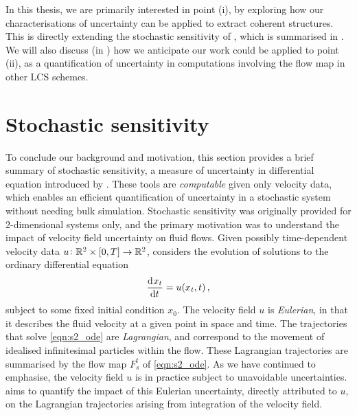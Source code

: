 In this thesis, we are primarily interested in point (i), by exploring how our characterisations of uncertainty can be applied to extract coherent structures.
This is directly extending the stochastic sensitivity of \citet{Balasuriya_2020_StochasticSensitivityComputable}, which is summarised in .
We will also discuss (in ) how we anticipate our work could be applied to point (ii), as a quantification of uncertainty in computations involving the flow map in other LCS schemes.




\section{Stochastic sensitivity}\label{sec:s2_summ}
To conclude our background and motivation, this section provides a brief summary of stochastic sensitivity, a measure of uncertainty in differential equation introduced by \citet{Balasuriya_2020_StochasticSensitivityComputable}.
These tools are \emph{computable} given only velocity data, which enables an efficient quantification of uncertainty in a stochastic system without needing bulk simulation.
Stochastic sensitivity was originally provided for 2-dimensional systems only, and the primary motivation was to understand the impact of velocity field uncertainty on fluid flows.
Given possibly time-dependent velocity data \(u\colon \mathbb{R}^2 \times [0,T] \to \mathbb{R}^2\), \citet{Balasuriya_2020_StochasticSensitivityComputable} considers the evolution of solutions to the ordinary differential equation
\begin{equation}\label{eqn:s2_ode}
	\dod{x_t}{t} = u\!\left(x_t, t\right),
\end{equation}
subject to some fixed initial condition \(x_0\).
The velocity field \(u\) is \emph{Eulerian}, in that it describes the fluid velocity at a given point in space and time.
The trajectories that solve \cref{eqn:s2_ode} are \emph{Lagrangian}, and correspond to the movement of idealised infinitesimal particles within the flow.
These Lagrangian trajectories are summarised by the flow map \(F_s^t\) of \cref{eqn:s2_ode}.
As we have continued to emphasise, the velocity field \(u\) is in practice subject to unavoidable uncertainties.
\citet{Balasuriya_2020_StochasticSensitivityComputable} aims to quantify the impact of this Eulerian uncertainty, directly attributed to \(u\), on the Lagrangian trajectories arising from integration of the velocity field.

